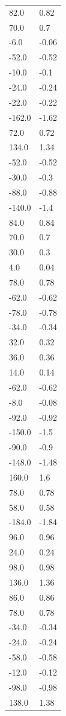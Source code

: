\begin{longtable}{ll}
82.0 & 0.82 \\
70.0 & 0.7 \\
-6.0 & -0.06 \\
-52.0 & -0.52 \\
-10.0 & -0.1 \\
-24.0 & -0.24 \\
-22.0 & -0.22 \\
-162.0 & -1.62 \\
72.0 & 0.72 \\
134.0 & 1.34 \\
-52.0 & -0.52 \\
-30.0 & -0.3 \\
-88.0 & -0.88 \\
-140.0 & -1.4 \\
84.0 & 0.84 \\
70.0 & 0.7 \\
30.0 & 0.3 \\
4.0 & 0.04 \\
78.0 & 0.78 \\
-62.0 & -0.62 \\
-78.0 & -0.78 \\
-34.0 & -0.34 \\
32.0 & 0.32 \\
36.0 & 0.36 \\
14.0 & 0.14 \\
-62.0 & -0.62 \\
-8.0 & -0.08 \\
-92.0 & -0.92 \\
-150.0 & -1.5 \\
-90.0 & -0.9 \\
-148.0 & -1.48 \\
160.0 & 1.6 \\
78.0 & 0.78 \\
58.0 & 0.58 \\
-184.0 & -1.84 \\
96.0 & 0.96 \\
24.0 & 0.24 \\
98.0 & 0.98 \\
136.0 & 1.36 \\
86.0 & 0.86 \\
78.0 & 0.78 \\
-34.0 & -0.34 \\
-24.0 & -0.24 \\
-58.0 & -0.58 \\
-12.0 & -0.12 \\
-98.0 & -0.98 \\
138.0 & 1.38 \\

\end{longtable}
